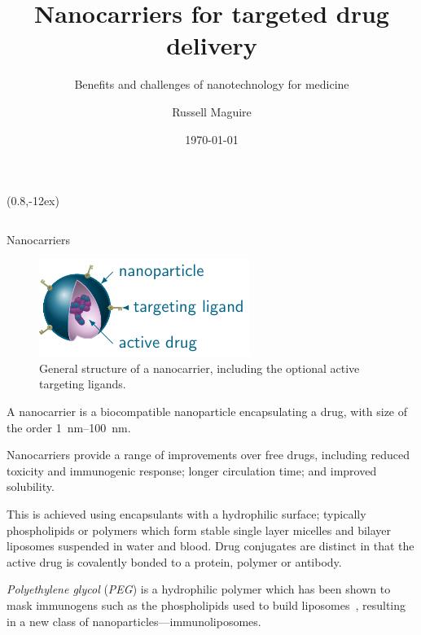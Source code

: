 \documentclass[final]{beamer}
\author{Russell Maguire}
\title{Nanocarriers for targeted drug delivery}
\subtitle{Benefits and challenges of nanotechnology for medicine}
\institute{ENGI4131 Advanced Semiconductor Devices \\ Durham University}
\date{\today}
\begin{document}
\begin{frame}[plain]
  
  \maketitle
  \begin{textblock*}{\textwidth}(0.8\textwidth,-12ex)
     \insertlogo
  \end{textblock*}

  \begin{columns}[t,onlytextwidth]
      \begin{block}{Nanocarriers\strut}
        \begin{multicols}{2}

          \begin{figure}[t]
            \centering
            \includegraphics[scale=4]{tikz/nanocarrier_structure.pdf}
            \caption{General structure of a \alert{nanocarrier}, including the optional \alert{active targeting} ligands.}
            \label{fig:structure}
          \end{figure}

          A nanocarrier is a \alert{biocompatible nanoparticle encapsulating a drug}, with size of the order \SIrange{1}{100}{\nano\meter}.

          Nanocarriers provide a range of improvements over free drugs, including \alert{reduced toxicity} and \alert{immunogenic response}; \alert{longer circulation time}; and \alert{improved solubility}.

          This is achieved using encapsulants with a hydrophilic surface; typically phospholipids or polymers which form stable \alert{single layer micelles} and \alert{bilayer liposomes} suspended in water and blood. \alert{Drug conjugates} are distinct in that the active drug is covalently bonded to a protein, polymer or antibody.

          \emph{Polyethylene glycol} (\emph{PEG}) is a hydrophilic polymer which has been shown to mask immunogens such as the phospholipids used to build liposomes~\cite{harris2003effect}, resulting in a new class of nanoparticles---\alert{immunoliposomes}. 


\end{multicols}
\end{block}
\end{columns}
\end{frame}
\end{document}
